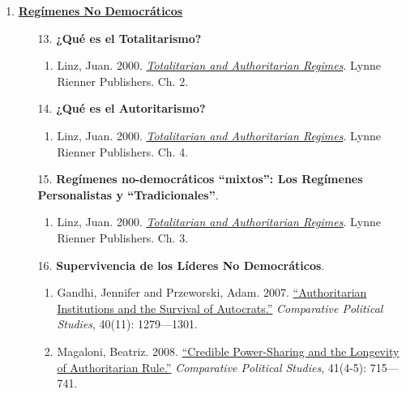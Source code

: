 \documentclass[letterpaper]{article}
\begin{document}
\begin{enumerate}
		\item {\bf \underline{Reg\'imenes No Democr\'aticos}}
			\begin{enumerate}
				
				\item[13.] {\bf ¿Qu\'e es el Totalitarismo?}
					\begin{enumerate}
						\item Linz, Juan. 2000. \href{https://github.com/hbahamonde/Ciencia_Politica_I/raw/master/Readings/Linz_2000.pdf}{\emph{Totalitarian and Authoritarian Regimes}}. Lynne Rienner Publishers. Ch. 2.
					\end{enumerate}

				\item[14.] {\bf ¿Qu\'e es el Autoritarismo?}
					\begin{enumerate}
						\item Linz, Juan. 2000. \href{https://github.com/hbahamonde/Ciencia_Politica_I/raw/master/Readings/Linz_2000.pdf}{\emph{Totalitarian and Authoritarian Regimes}}. Lynne Rienner Publishers. Ch. 4.
					\end{enumerate}


        \item[15.] {\bf Reg\'imenes no-democr\'aticos ``mixtos'': Los Reg\'imenes Personalistas y ``Tradicionales''}.
          \begin{enumerate}
            \item Linz, Juan. 2000. \href{https://github.com/hbahamonde/Ciencia_Politica_I/raw/master/Readings/Linz_2000.pdf}{\emph{Totalitarian and Authoritarian Regimes}}. Lynne Rienner Publishers. Ch. 3.
          \end{enumerate}


				\item[16.] {\bf Supervivencia de los L\'ideres No Democr\'aticos}.
					\begin{enumerate}
						\item Gandhi, Jennifer and Przeworski, Adam. 2007. \href{https://github.com/hbahamonde/Ciencia_Politica_I/raw/master/Readings/Gandhi_Przeworski.pdf}{``Authoritarian Institutions and the Survival of Autocrats.''} \emph{Comparative Political Studies}, 40(11): 1279---1301.
						
						\item Magaloni, Beatriz. 2008. \href{https://github.com/hbahamonde/Ciencia_Politica_I/raw/master/Readings/Magaloni.pdf}{``Credible Power-Sharing and the Longevity of Authoritarian Rule.''} \emph{Comparative Political Studies}, 41(4-5): 715---741.
					\end{enumerate}
				



\end{enumerate}
\end{enumerate}
\end{document}
